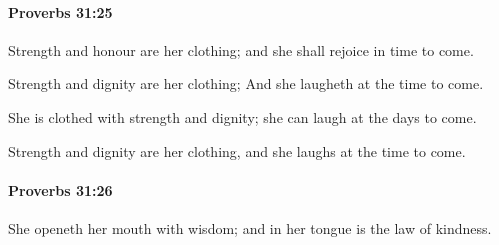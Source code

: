 		\paragraph{Proverbs 31:25} %
			\label{PROVERBS-31-25}

			Strength and honour are her clothing; and she shall rejoice in time to come.

			\begin{versebox}
					\item[BHS] 
					\item[ASV] Strength and dignity are her clothing; And she laugheth at the time to come.
					\item[NIV] She is clothed with strength and dignity; she can laugh at the days to come.
					\item[NRSV] Strength and dignity are her clothing, and she laughs at the time to come.
			\end{versebox}

		\paragraph{Proverbs 31:26} %
			\label{PROVERBS-31-26}

			She openeth her mouth with wisdom; and in her tongue is the law of kindness.

